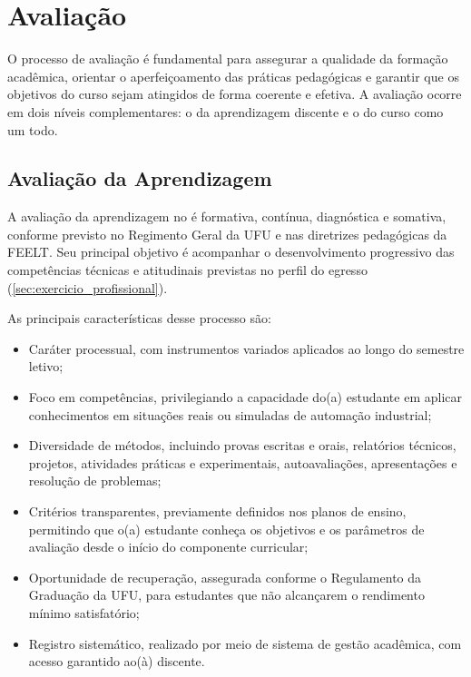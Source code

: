 \chapter{Avaliação}
\label{chp:avaliacao}

O processo de avaliação é fundamental para assegurar a qualidade da formação acadêmica, orientar o aperfeiçoamento das práticas pedagógicas e garantir que os objetivos do curso sejam atingidos de forma coerente e efetiva. A avaliação ocorre em dois níveis complementares: o da aprendizagem discente e o do curso como um todo.

\section{Avaliação da Aprendizagem}

A avaliação da aprendizagem no \ppccurso é formativa, contínua, diagnóstica e somativa, conforme previsto no Regimento Geral da UFU e nas diretrizes pedagógicas da FEELT. Seu principal objetivo é acompanhar o desenvolvimento progressivo das competências técnicas e atitudinais previstas no perfil do egresso (\autoref{sec:exercicio_profissional}).

As principais características desse processo são:

\begin{itemize}
    \item Caráter processual, com instrumentos variados aplicados ao longo do semestre letivo;
    \item Foco em competências, privilegiando a capacidade do(a) estudante em aplicar conhecimentos em situações reais ou simuladas de automação industrial;
    \item Diversidade de métodos, incluindo provas escritas e orais, relatórios técnicos, projetos, atividades práticas e experimentais, autoavaliações, apresentações e resolução de problemas;
    \item Critérios transparentes, previamente definidos nos planos de ensino, permitindo que o(a) estudante conheça os objetivos e os parâmetros de avaliação desde o início do componente curricular;
    \item Oportunidade de recuperação, assegurada conforme o Regulamento da Graduação da UFU, para estudantes que não alcançarem o rendimento mínimo satisfatório;
    \item Registro sistemático, realizado por meio de sistema de gestão acadêmica, com acesso garantido ao(à) discente.
\end{itemize}

